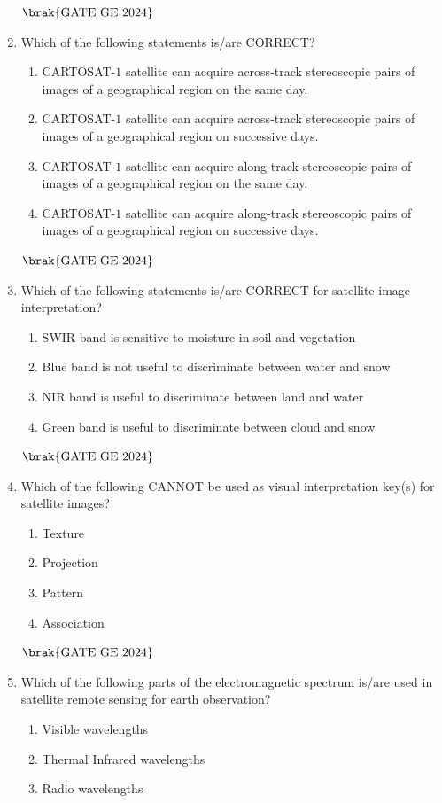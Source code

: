 \documentclass[journal,12pt,onecolumn]{IEEEtran}
\theoremstyle{remark}
\begin{document}
\begin{enumerate}
\hfill $\brak{\text{GATE GE 2024}}$
\bigskip
\item Which of the following statements is/are CORRECT?
\begin{enumerate}
\item CARTOSAT-$1$ satellite can acquire across-track stereoscopic pairs of images of a geographical region on the same day.
\item CARTOSAT-$1$ satellite can acquire across-track stereoscopic pairs of images of a geographical region on successive days.
\item CARTOSAT-$1$ satellite can acquire along-track stereoscopic pairs of images of a geographical region on the same day.
\item CARTOSAT-$1$ satellite can acquire along-track stereoscopic pairs of images of a geographical region on successive days.
\end{enumerate}
\hfill $\brak{\text{GATE GE 2024}}$
\bigskip
\item Which of the following statements is/are CORRECT for satellite image interpretation?
\begin{enumerate}
\item SWIR band is sensitive to moisture in soil and vegetation
\item Blue band is not useful to discriminate between water and snow
\item NIR band is useful to discriminate between land and water
\item Green band is useful to discriminate between cloud and snow
\end{enumerate}
\hfill $\brak{\text{GATE GE 2024}}$
\bigskip
\item Which of the following CANNOT be used as visual interpretation key(s) for satellite images?
\begin{enumerate}
\item Texture
\item Projection
\item Pattern
\item Association
\end{enumerate}
\hfill $\brak{\text{GATE GE 2024}}$
\bigskip
\item Which of the following parts of the electromagnetic spectrum is/are used in satellite remote sensing for earth observation?
\begin{enumerate}
\item Visible wavelengths
\item Thermal Infrared wavelengths
\item Radio wavelengths

\end{enumerate}
\end{enumerate}
\end{document}
